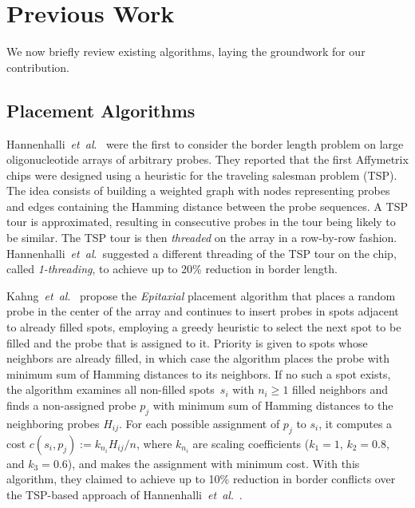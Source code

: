 \documentclass{llncs}
\newcommand{\ignore}[1]{}
\begin{document}
\section{Previous Work}
\label{sec:previous_work}

We now briefly review existing algorithms, laying the groundwork for our
contribution.

\subsection{Placement Algorithms}
\label{sec:placement_alg}

\ignore{The first to formally address the border length problem were \cite{FELDMAN93}.
They showed how an optimal placement can be constructed based on a two-dimensional
Gray code. However, their work is restricted to \emph{uniform arrays} (arrays
containing all possible probes of a given length) and synchronous embeddings.}

Hannenhalli~{\it et~al}.\ \cite{HANNENHALLI02} were the first to consider the border
length problem on large
oligonucleotide arrays of arbitrary probes. They reported that the first Affymetrix
chips were designed using a heuristic for the traveling salesman problem (TSP). The
idea consists of building a weighted graph with nodes representing probes and edges
containing the Hamming distance between the probe sequences. A TSP tour is approximated,
resulting in consecutive probes in the tour being likely to be similar. The TSP
tour is then \emph{threaded} on the array in a row-by-row fashion.
Hannenhalli~{\it et~al}.\ suggested a different threading of the TSP tour on the chip,
called \emph{1-threading}, to achieve up to 20\% reduction in border length.

Kahng~{\it et~al}.~\cite{KAHNG02} propose the \emph{Epitaxial} placement algorithm that
places a random probe in the center of the array and continues to
insert probes in spots adjacent to already filled spots, employing a
greedy heuristic to select the next spot to be filled and the probe
that is assigned to it. Priority is given to spots whose
neighbors are already filled, in which case the algorithm places the
probe with minimum sum of Hamming distances to its neighbors. If no
such a spot exists, the algorithm examines all non-filled spots~$s_i$
with $n_i \geq 1$ filled neighbors and finds a non-assigned probe
$p_j$ with minimum sum of Hamming distances to the neighboring probes
$H_{ij}$. For each possible assignment of $p_j$ to $s_i$, it computes
a cost $c(s_i,p_j) := k_{n_i} H_{ij} / n$, where $k_{n_i}$ are scaling
coefficients ($k_1 = 1$, $k_2 = 0.8$, and $k_3 = 0.6$), and makes the
assignment with minimum cost. With this algorithm, they claimed to
achieve up to 10\% reduction in border conflicts over the TSP-based
approach of Hannenhalli~{\it et~al}.\ \cite{HANNENHALLI02}.
\end{document}
